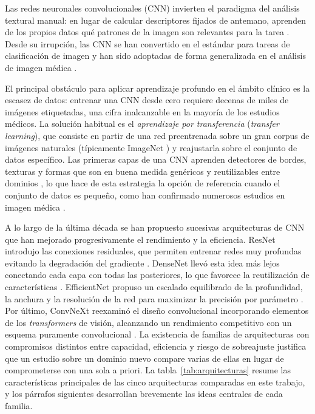 \documentclass[12pt]{extarticle}
\numberwithin{equation}{section}
\begin{document}
\begin{refsection}
Las redes neuronales convolucionales (CNN) invierten el paradigma del análisis textural manual: en lugar de calcular descriptores fijados de antemano, aprenden de los propios datos qué patrones de la imagen son relevantes para la tarea \cite{krizhevsky2012imagenet}. Desde su irrupción, las CNN se han convertido en el estándar para tareas de clasificación de imagen y han sido adoptadas de forma generalizada en el análisis de imagen médica \cite{litjens2017survey,shen2017deep}.

El principal obstáculo para aplicar aprendizaje profundo en el ámbito clínico es la escasez de datos: entrenar una CNN desde cero requiere decenas de miles de imágenes etiquetadas, una cifra inalcanzable en la mayoría de los estudios médicos. La solución habitual es el \textit{aprendizaje por transferencia} (\textit{transfer learning}), que consiste en partir de una red preentrenada sobre un gran corpus de imágenes naturales (típicamente ImageNet \cite{deng2009imagenet}) y reajustarla sobre el conjunto de datos específico. Las primeras capas de una CNN aprenden detectores de bordes, texturas y formas que son en buena medida genéricos y reutilizables entre dominios \cite{yosinski2014transferable}, lo que hace de esta estrategia la opción de referencia cuando el conjunto de datos es pequeño, como han confirmado numerosos estudios en imagen médica \cite{tajbakhsh2016convolutional,litjens2017survey}.

A lo largo de la última década se han propuesto sucesivas arquitecturas de CNN que han mejorado progresivamente el rendimiento y la eficiencia. ResNet introdujo las conexiones residuales, que permiten entrenar redes muy profundas evitando la degradación del gradiente \cite{he2016deep}. DenseNet llevó esta idea más lejos conectando cada capa con todas las posteriores, lo que favorece la reutilización de características \cite{huang2017densely}. EfficientNet propuso un escalado equilibrado de la profundidad, la anchura y la resolución de la red para maximizar la precisión por parámetro \cite{tan2019efficientnet}. Por último, ConvNeXt reexaminó el diseño convolucional incorporando elementos de los \textit{transformers} de visión, alcanzando un rendimiento competitivo con un esquema puramente convolucional \cite{liu2022convnet}. La existencia de familias de arquitecturas con compromisos distintos entre capacidad, eficiencia y riesgo de sobreajuste justifica que un estudio sobre un dominio nuevo compare varias de ellas en lugar de comprometerse con una sola a priori. La tabla~\ref{tab:arquitecturas} resume las características principales de las cinco arquitecturas comparadas en este trabajo, y los párrafos siguientes desarrollan brevemente las ideas centrales de cada familia.


\end{refsection}
\end{document}
